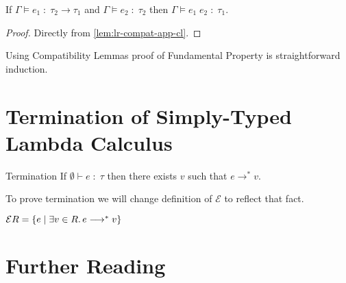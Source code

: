 \begin{lemma}
  If $\Gamma \models e_1 \;:\; \tau_2 \to \tau_1 $
  and $\Gamma \models e_2 \;:\; \tau_2$
  then $\Gamma \models e_1\;e_2 \;:\; \tau_1$.
\end{lemma}
\begin{proof}
  Directly from \autoref{lem:lr-compat-app-cl}.
\end{proof}

\medskip

Using Compatibility Lemmas proof of Fundamental Property is straightforward induction.

\section{Termination of Simply-Typed Lambda Calculus}

\begin{theorem}{Termination}
  If $\emptyset \vdash e \;:\; \tau$ then
  there exists $v$ such that $e \longrightarrow^* v$.
\end{theorem}

To prove termination we will change definition of $\mathcal{E}$ to reflect that fact.

$\mathcal{E}R = \{ e \mid \exists v \in R\ldotp e \longrightarrow^* v \}$

\section{Further Reading}
